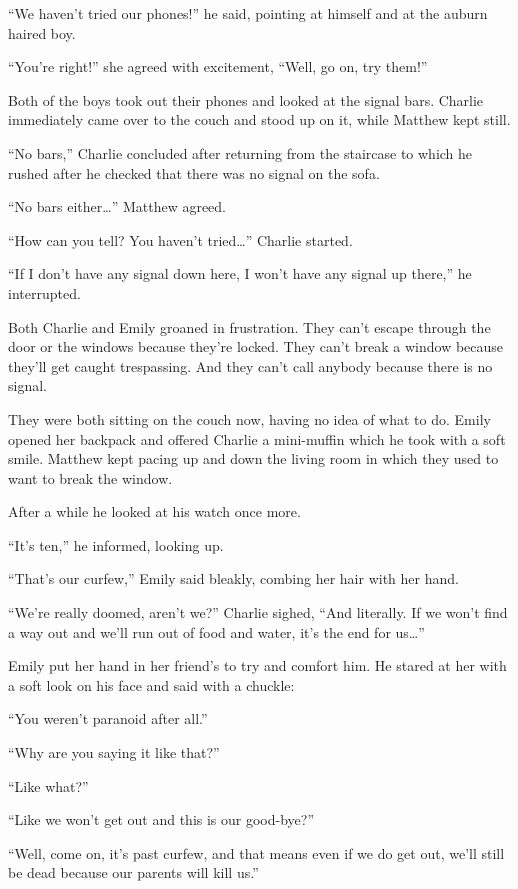“We haven't tried our phones!” he said, pointing at himself and at the auburn haired boy.

“You're right!” she agreed with excitement, “Well, go on, try them!”

Both of the boys took out their phones and looked at the signal bars. Charlie immediately came over to the couch and stood up on it, while Matthew kept still.

“No bars,” Charlie concluded after returning from the staircase to which he rushed after he checked that there was no signal on the sofa.

“No bars either…” Matthew agreed.

“How can you tell? You haven't tried…” Charlie started.

“If I don't have any signal down here, I won't have any signal up there,” he interrupted.

Both Charlie and Emily groaned in frustration. They can't escape through the door or the windows because they're locked. They can't break a window because they'll get caught trespassing. And they can't call anybody because there is no signal.

They were both sitting on the couch now, having no idea of what to do. Emily opened her backpack and offered Charlie a mini-muffin which he took with a soft smile. Matthew kept pacing up and down the living room in which they used to want to break the window.

After a while he looked at his watch once more.

“It's ten,” he informed, looking up.

“That's our curfew,” Emily said bleakly, combing her hair with her hand.

“We're really doomed, aren't we?” Charlie sighed, “And literally. If we won't find a way out and we'll run out of food and water, it's the end for us…”

Emily put her hand in her friend's to try and comfort him. He stared at her with a soft look on his face and said with a chuckle:

“You weren't paranoid after all.”

“Why are you saying it like that?”

“Like what?”

“Like we won't get out and this is our good-bye?”

“Well, come on, it's past curfew, and that means even if we do get out, we'll still be dead because our parents will kill us.”

